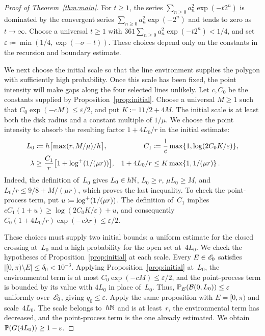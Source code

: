 \documentclass[11pt,letterpaper]{article}
\begin{document}
\begin{proof}[Proof of Theorem~\ref{thm:main}]
For $t\ge1$, the series $\sum_{n\ge0}a_n^2\exp(-t2^n)$ is dominated by the convergent series $\sum_{n\ge0}a_n^2\exp(-2^n)$ and tends to zero as $t\to\infty$. Choose a universal $t\ge1$ with $361\sum_{n\ge0}a_n^2\exp(-t2^n)<1/4$, and set $\varepsilon\coloneqq\min(1/4,\exp(-\sigma-t))$. These choices depend only on the constants in the recursion and boundary estimate.

We next choose the initial scale so that the line environment supplies the polygon with sufficiently high probability. Once this scale has been fixed, the point intensity will make gaps along the four selected lines unlikely. Let $c,C_0$ be the constants supplied by Proposition~\ref{prop:initial}. Choose a universal $M\ge1$ such that $C_0\exp(-cM)\le\varepsilon/2$, and put $K\coloneqq11/2+4M$. The initial scale is at least both the disk radius and a constant multiple of $1/\mu$. We choose the point intensity to absorb the resulting factor $1+4L_0/r$ in the initial estimate:
\begin{align}\label{eq:parameter-choice}
  L_0&\coloneqq h\bigl\lceil\max(r,M/\mu)/h\bigr\rceil,&C_1&\coloneqq\frac1c\max\{1,\log(2C_0K/\varepsilon)\},\\
  \lambda&\ge\frac{C_1}{r}\bigl[1+\logp(1/(\mu r))\bigr],&1+4L_0/r&\le K\max\{1,1/(\mu r)\}\,.\notag
\end{align}
Indeed, the definition of~$L_0$ gives $L_0\in h\N$, $L_0\ge r$, $\mu L_0\ge M$, and $L_0/r\le9/8+M/(\mu r)$, which proves the last inequality. To check the point-process term, put $u\coloneqq\logp(1/(\mu r))$. The definition of~$C_1$ implies $cC_1(1+u)\ge\log(2C_0K/\varepsilon)+u$, and consequently $C_0(1+4L_0/r)\exp(-c\lambda r)\le\varepsilon/2$.

These choices must supply two initial bounds: a uniform estimate for the closed crossing at~$L_0$ and a high probability for the open set at~$4L_0$. We check the hypotheses of Proposition~\ref{prop:initial} at each scale. Every $E\in\cE_0$ satisfies $\lvert[0,\pi)\setminus E\rvert\le\delta_0<10^{-3}$. Applying Proposition~\ref{prop:initial} at~$L_0$, the environmental term is at most $C_0\exp(-cM)\le\varepsilon/2$, and the point-process term is bounded by its value with $4L_0$ in place of~$L_0$. Thus, $\P_E(\cB(0,L_0))\le\varepsilon$ uniformly over~$\cE_0$, giving $q_0\le\varepsilon$. Apply the same proposition with $E=[0,\pi)$ and scale~$4L_0$. The scale belongs to~$h\N$ and is at least~$r$, the environmental term has decreased, and the point-process term is the one already estimated. We obtain $\P(G(4L_0))\ge1-\varepsilon$.


\end{proof}
\end{document}
